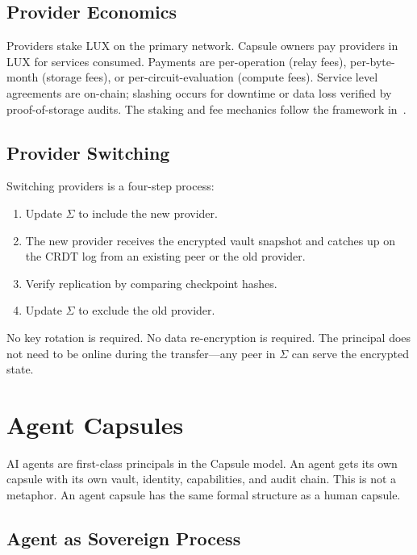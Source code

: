\documentclass[11pt,a4paper]{article}
\begin{document}
\subsection{Provider Economics}

Providers stake LUX on the primary network. Capsule owners pay providers in LUX
for services consumed. Payments are per-operation (relay fees), per-byte-month
(storage fees), or per-circuit-evaluation (compute fees). Service level
agreements are on-chain; slashing occurs for downtime or data loss verified
by proof-of-storage audits. The staking and fee mechanics follow the framework
in~\cite{lux-tokenomics}.

\subsection{Provider Switching}

Switching providers is a four-step process:
\begin{enumerate}[nosep]
  \item Update $\Sigma$ to include the new provider.
  \item The new provider receives the encrypted vault snapshot and catches up
        on the CRDT log from an existing peer or the old provider.
  \item Verify replication by comparing checkpoint hashes.
  \item Update $\Sigma$ to exclude the old provider.
\end{enumerate}

No key rotation is required. No data re-encryption is required. The principal
does not need to be online during the transfer---any peer in $\Sigma$ can serve
the encrypted state.

\section{Agent Capsules}\label{sec:agents}

AI agents are first-class principals in the Capsule model. An agent gets its
own capsule with its own vault, identity, capabilities, and audit chain.
This is not a metaphor. An agent capsule has the same formal structure as a
human capsule.

\subsection{Agent as Sovereign Process}
\end{document}
